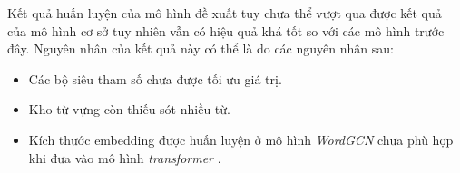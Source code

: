 Kết quả huấn luyện của mô hình đề xuất tuy chưa thể vượt qua được kết quả của mô hình cơ sở tuy nhiên vẫn có hiệu quả khá tốt so với các mô hình trước đây. Nguyên nhân của kết quả này có thể là do các nguyên nhân sau:
\begin{itemize}
	\item Các bộ siêu tham số chưa được tối ưu giá trị.
	\item Kho từ vựng còn thiếu sót nhiều từ.
	\item Kích thước embedding được huấn luyện ở mô hình \textit{WordGCN} chưa phù hợp khi đưa vào mô hình \textit{transformer} .
\end{itemize}